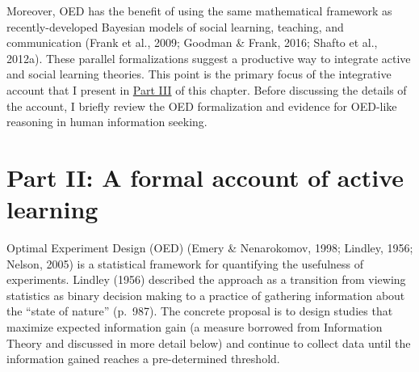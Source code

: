 \documentclass[oneside]{report}
\begin{document}
Moreover, OED has the benefit of using the same mathematical framework
as recently-developed Bayesian models of social learning, teaching, and
communication (Frank et al., 2009; Goodman \& Frank, 2016; Shafto et
al., 2012a). These parallel formalizations suggest a productive way to
integrate active and social learning theories. This point is the primary
focus of the integrative account that I present in
\protect\hyperlink{active_social}{Part III} of this chapter. Before
discussing the details of the account, I briefly review the OED
formalization and evidence for OED-like reasoning in human information
seeking.

\hypertarget{oed}{\section{Part II: A formal account of active
learning}\label{oed}}

Optimal Experiment Design (OED) (Emery \& Nenarokomov, 1998; Lindley,
1956; Nelson, 2005) is a statistical framework for quantifying the
usefulness of experiments. Lindley (1956) described the approach as a
transition from viewing statistics as binary decision making to a
practice of gathering information about the ``state of nature''
(p.~987). The concrete proposal is to design studies that maximize
expected information gain (a measure borrowed from Information Theory
and discussed in more detail below) and continue to collect data until
the information gained reaches a pre-determined threshold.
\end{document}
